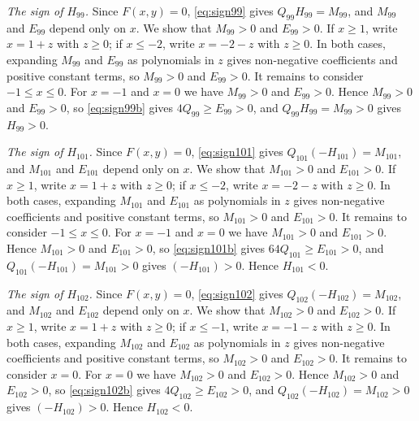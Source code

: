 \documentclass[11pt]{article}
\begin{document}
\emph{The sign of $H_{99}$.} Since $F(x,y)=0$, \eqref{eq:sign99} gives $Q_{99}H_{99}=M_{99}$, and $M_{99}$ and $E_{99}$ depend only on $x$. We show that $M_{99}>0$ and $E_{99}>0$. If $x\geq1$, write $x=1+z$ with $z\geq0$; if $x\leq-2$, write $x=-2-z$ with $z\geq0$. In both cases, expanding $M_{99}$ and $E_{99}$ as polynomials in $z$ gives non-negative coefficients and positive constant terms, so $M_{99}>0$ and $E_{99}>0$. It remains to consider $-1\leq x\leq0$. For $x=-1$ and $x=0$ we have $M_{99}>0$ and $E_{99}>0$. Hence $M_{99}>0$ and $E_{99}>0$, so \eqref{eq:sign99b} gives $4Q_{99}\geq E_{99}>0$, and $Q_{99}H_{99}=M_{99}>0$ gives $H_{99}>0$.

\emph{The sign of $H_{101}$.} Since $F(x,y)=0$, \eqref{eq:sign101} gives $Q_{101}(-H_{101})=M_{101}$, and $M_{101}$ and $E_{101}$ depend only on $x$. We show that $M_{101}>0$ and $E_{101}>0$. If $x\geq1$, write $x=1+z$ with $z\geq0$; if $x\leq-2$, write $x=-2-z$ with $z\geq0$. In both cases, expanding $M_{101}$ and $E_{101}$ as polynomials in $z$ gives non-negative coefficients and positive constant terms, so $M_{101}>0$ and $E_{101}>0$. It remains to consider $-1\leq x\leq0$. For $x=-1$ and $x=0$ we have $M_{101}>0$ and $E_{101}>0$. Hence $M_{101}>0$ and $E_{101}>0$, so \eqref{eq:sign101b} gives $64Q_{101}\geq E_{101}>0$, and $Q_{101}(-H_{101})=M_{101}>0$ gives $(-H_{101})>0$. Hence $H_{101}<0$.

\emph{The sign of $H_{102}$.} Since $F(x,y)=0$, \eqref{eq:sign102} gives $Q_{102}(-H_{102})=M_{102}$, and $M_{102}$ and $E_{102}$ depend only on $x$. We show that $M_{102}>0$ and $E_{102}>0$. If $x\geq1$, write $x=1+z$ with $z\geq0$; if $x\leq-1$, write $x=-1-z$ with $z\geq0$. In both cases, expanding $M_{102}$ and $E_{102}$ as polynomials in $z$ gives non-negative coefficients and positive constant terms, so $M_{102}>0$ and $E_{102}>0$. It remains to consider $x=0$. For $x=0$ we have $M_{102}>0$ and $E_{102}>0$. Hence $M_{102}>0$ and $E_{102}>0$, so \eqref{eq:sign102b} gives $4Q_{102}\geq E_{102}>0$, and $Q_{102}(-H_{102})=M_{102}>0$ gives $(-H_{102})>0$. Hence $H_{102}<0$.
\end{document}
